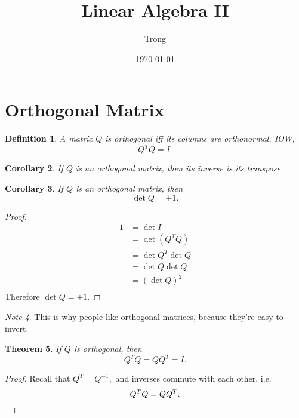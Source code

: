 \documentclass[20pt]{extarticle}
\title{Linear Algebra II}
\author{Trong}
\date{\today}
\theoremstyle{plain}
\newtheorem{theorem}{Theorem}
\newtheorem{corollary}[theorem]{Corollary}
\newtheorem{definition}[theorem]{Definition}
\theoremstyle{definition}
\theoremstyle{remark}
\newtheorem{note}[theorem]{Note}
\newcommand{\0}{\varnothing}
\newcommand{\<}{\langle}
\renewcommand{\>}{\rangle}
\begin{document}
\sloppy
\maketitle
\thispagestyle{empty}
\pagestyle{empty}

\tableofcontents
\pagebreak

\section{Orthogonal Matrix}

\begin{definition}
  A matrix \( Q \) is orthogonal iff its columns are orthonormal, IOW,
  \[
  Q^{T} Q = I.
  \]
\end{definition}

\begin{corollary}
  If \( Q \) is an orthogonal matrix, then its inverse is its transpose.
\end{corollary}

\begin{corollary}
  If \( Q \) is an orthogonal matrix, then
\[
\det Q = \pm 1.
\]
\end{corollary}

\begin{proof}
  \[
\begin{aligned}
1 &= \det I \\
  &= \det(Q^{T} Q) \\
  &= \det Q^{T} \det Q \\
  &= \det Q \det Q \\
  &= (\det Q)^{2} \\
\end{aligned}
\]
Therefore \( \det Q = \pm 1. \)
\end{proof}

\begin{note}
  This is why people like orthogonal matrices, because they're easy to invert.
\end{note}

\begin{theorem}
  If \( Q \) is orthogonal, then
\[
Q^{T} Q = Q Q^{T} = I.
\]
\end{theorem}

\begin{proof}
  Recall that \( Q^{T} = Q^{-1}, \) and inverses commute with each other, i.e.
\[
Q^{T} Q = Q Q^{T}. \qedhere
\]
\end{proof}
\end{document}
